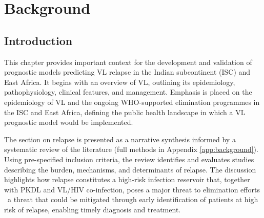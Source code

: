 \chapter{\label{ch:2-background}Background}
\minitoc

\section{Introduction}


This chapter provides important context for the development and validation of prognostic models predicting VL relapse in the Indian subcontinent (ISC) and East Africa. It begins with an overview of VL, outlining its epidemiology, pathophysiology, clinical features, and management. Emphasis is placed on the epidemiology of VL and the ongoing WHO-supported elimination programmes in the ISC and East Africa, defining the public health landscape in which a VL prognostic model would be implemented.

The section on relapse is presented as a narrative synthesis informed by a systematic review of the literature (full methods in Appendix \ref{app:background}). Using pre-specified inclusion criteria, the review identifies and evaluates studies describing the burden, mechanisms, and determinants of relapse. The discussion highlights how relapse constitutes a high-risk infection reservoir that, together with PKDL and VL/HIV co-infection, poses a major threat to elimination efforts \textemdash\ a threat that could be mitigated through early identification of patients at high risk of relapse, enabling timely diagnosis and treatment.

